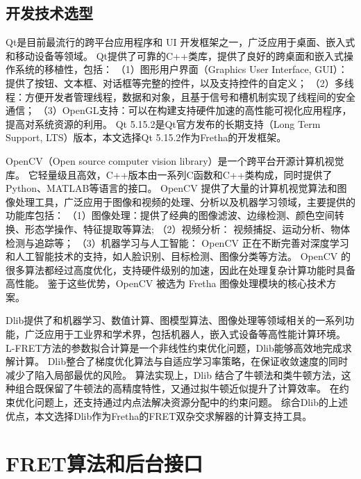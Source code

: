 \subsection{开发技术选型}
Qt是目前最流行的跨平台应用程序和 UI 开发框架之一，广泛应用于桌面、嵌入式和移动设备等领域。
Qt提供了可靠的C++类库，提供了良好的跨桌面和嵌入式操作系统的移植性，包括：
（1）图形用户界面（Graphics User Interface, GUI）：提供了按钮、文本框、对话框等完整的控件，以及支持控件的自定义；
（2）多线程：方便开发者管理线程，数据和对象，且基于信号和槽机制实现了线程间的安全通信；
（3）OpenGL支持：可以在构建支持硬件加速的高性能可视化应用程序，提高对系统资源的利用。
Qt 5.15.2是Qt官方发布的长期支持（Long Term Support, LTS）版本，本文选择Qt 5.15.2作为Fretha的开发框架。

OpenCV（Open source computer vision library）是一个跨平台开源计算机视觉库。
它轻量级且高效，C++版本由一系列C函数和C++类构成，同时提供了Python、MATLAB等语言的接口。
OpenCV 提供了大量的计算机视觉算法和图像处理工具，广泛应用于图像和视频的处理、分析以及机器学习领域，主要提供的功能库包括：
（1）图像处理：提供了经典的图像滤波、边缘检测、颜色空间转换、形态学操作、特征提取等算法;
（2）视频分析： 视频捕捉、运动分析、物体检测与追踪等；
（3）机器学习与人工智能： OpenCV 正在不断完善对深度学习和人工智能技术的支持，如人脸识别、目标检测、图像分类等方法。
OpenCV 的很多算法都经过高度优化，支持硬件级别的加速，因此在处理复杂计算功能时具备高性能。
鉴于这些优势，OpenCV 被选为 Fretha 图像处理模块的核心技术方案。

Dlib提供了和机器学习、数值计算、图模型算法、图像处理等领域相关的一系列功能，广泛应用于工业界和学术界，包括机器人，嵌入式设备等高性能计算环境。
L-FRET方法的参数拟合计算是一个非线性约束优化问题，Dlib能够高效地完成求解计算。
Dlib整合了梯度优化算法与自适应学习率策略，在保证收敛速度的同时减少了陷入局部最优的风险。
算法实现上，Dlib 结合了牛顿法和类牛顿方法，这种组合既保留了牛顿法的高精度特性，又通过拟牛顿近似提升了计算效率。
在约束优化问题上，还支持通过内点法解决资源分配中的约束问题。
综合Dlib的上述优点，本文选择Dlib作为Fretha的FRET双杂交求解器的计算支持工具。

\section{FRET算法和后台接口}

